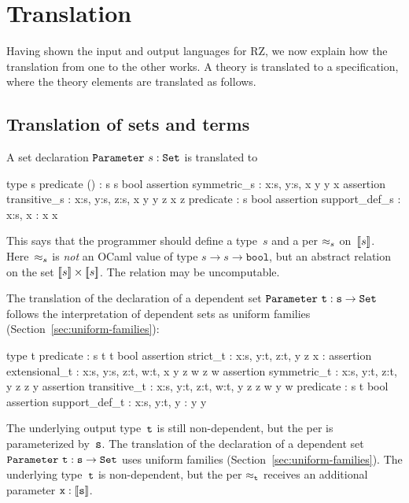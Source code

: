 \section{Translation}
\label{sec:translation}

\iflong
Having shown the input and output languages for RZ,
we now explain how the translation from one to the other works.
A theory is translated to a
specification, where the theory elements are translated as follows.
\fi %


\subsection{Translation of sets and terms}
\label{sec:transl-sets-terms}

A set declaration $\mathtt{Parameter}\ s : \mathtt{Set}$ is translated to
%
\begin{source}
type s
predicate () : s \iTo s \iTo bool
assertion symmetric_s :  \iForall x:s, y:s, x  y \iTo y  x
assertion transitive_s : \iForall x:s, y:s, z:s, x  y \iAnd y  z \iTo x  z
predicate  : s \iTo bool
assertion support_def_s :  \iForall x:s,  x :  \iIff x  x
\end{source}
%
This says that the programmer should define a type~$s$ and a per
$\approx_s$ on~$[\![s]\!]$. Here~$\approx_s$ is \emph{not} an OCaml value
of type $s \to s \to \mathtt{bool}$, but an abstract relation on the
set $[\![s]\!] \times [\![s]\!]$.  The relation may be uncomputable.

\iflong
The translation of the declaration of a dependent set
$\mathtt{Parameter}\ \mathtt{t} : \mathtt{s} \to \mathtt{Set}$ follows the interpretation of dependent
sets as uniform families (Section~\ref{sec:uniform-families}):
%
\begin{source}
type t
predicate  : s \iTo t \iTo t \iTo bool
assertion strict_t :  \iForall x:s, y:t, z:t, y  z \iTo x : 
assertion extensional_t :
  \iForall x:s, y:s, z:t, w:t, x  y \iTo z  w \iTo z  w
assertion symmetric_t : \iForall x:s, y:t, z:t, y  z \iTo z  y
assertion transitive_t :
  \iForall x:s, y:t, z:t, w:t, y  z \iAnd z  w \iTo y  w
predicate  : s \iTo t \iTo bool
assertion support_def_t :  \iForall x:s, y:t, y :  \iIff y  y
\end{source}
%
The underlying output type~$\mathtt{t}$ is still non-dependent, but the per is
parameterized by~$\mathtt{s}$.
\else %
The translation of the declaration of a dependent set
$\mathtt{Parameter}\ \mathtt{t} : \mathtt{s} \to \mathtt{Set}$ uses uniform families
(Section~\ref{sec:uniform-families}). The underlying type~$\mathtt{t}$ is
non-dependent, but the per $\approx_{\mathtt{t}}$ receives an additional
parameter $\mathtt{x} : [\![\mathtt{s}]\!]$.
\fi %

